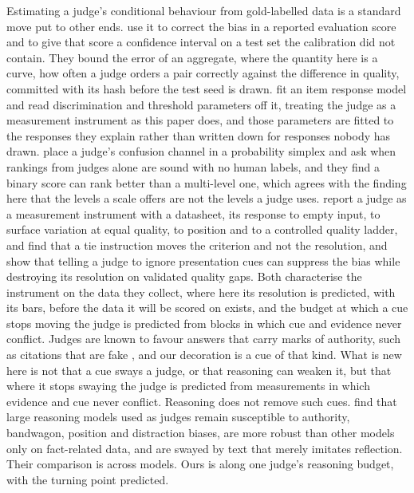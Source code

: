 \documentclass{article}
\theoremstyle{definition}
\theoremstyle{remark}
\begin{document}
Estimating a judge's conditional behaviour from gold-labelled data is a standard move put to other ends.
\citet{lee2025report} use it to correct the bias in a reported evaluation score and to give that score a confidence interval on a test set the calibration did not contain.
They bound the error of an aggregate, where the quantity here is a curve, how often a judge orders a pair correctly against the difference in quality, committed with its hash before the test seed is drawn.
\citet{choi2026irt} fit an item response model and read discrimination and threshold parameters off it, treating the judge as a measurement instrument as this paper does, and those parameters are fitted to the responses they explain rather than written down for responses nobody has drawn.
\citet{vossler2026simplex} place a judge's confusion channel in a probability simplex and ask when rankings from judges alone are sound with no human labels, and they find a binary score can rank better than a multi-level one, which agrees with the finding here that the levels a scale offers are not the levels a judge uses.
\citet{usami2026darkcurrent} report a judge as a measurement instrument with a datasheet, its response to empty input, to surface variation at equal quality, to position and to a controlled quality ladder, and find that a tie instruction moves the criterion and not the resolution, and \citet{zhao2026debiasing} show that telling a judge to ignore presentation cues can suppress the bias while destroying its resolution on validated quality gaps. Both characterise the instrument on the data they collect, where here its resolution is predicted, with its bars, before the data it will be scored on exists, and the budget at which a cue stops moving the judge is predicted from blocks in which cue and evidence never conflict.
Judges are known to favour answers that carry marks of authority, such as citations that are fake \citep{ye2025justice}, and our decoration is a cue of that kind.
What is new here is not that a cue sways a judge, or that reasoning can weaken it, but that where it stops swaying the judge is predicted from measurements in which evidence and cue never conflict.
Reasoning does not remove such cues. \citet{wang2025judgingbias} find that large reasoning models used as judges remain susceptible to authority, bandwagon, position and distraction biases, are more robust than other models only on fact-related data, and are swayed by text that merely imitates reflection.
Their comparison is across models.
Ours is along one judge's reasoning budget, with the turning point predicted.
\end{document}
